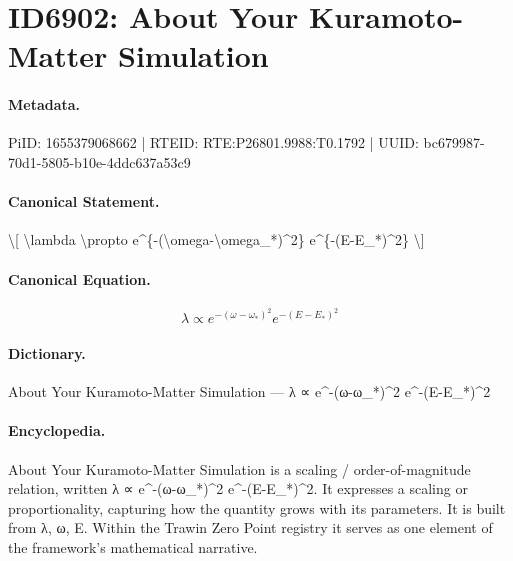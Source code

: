 \section*{ID6902: About Your Kuramoto-Matter Simulation}
\paragraph{Metadata.}
PiID: 1655379068662 | RTEID: RTE:P26801.9988:T0.1792 | UUID: bc679987-70d1-5805-b10e-4ddc637a53c9

\paragraph{Canonical Statement.}
\textbackslash{}[ \textbackslash{}lambda \textbackslash{}propto e\textasciicircum{}\{-(\textbackslash{}omega-\textbackslash{}omega\_*)\textasciicircum{}2\} e\textasciicircum{}\{-(E-E\_*)\textasciicircum{}2\} \textbackslash{}]

\paragraph{Canonical Equation.}
\[
\lambda \propto e^{-(\omega-\omega_*)^2} e^{-(E-E_*)^2}
\]

\paragraph{Dictionary.}
About Your Kuramoto-Matter Simulation — λ ∝ e\textasciicircum{}-(ω-ω\_*)\textasciicircum{}2 e\textasciicircum{}-(E-E\_*)\textasciicircum{}2

\paragraph{Encyclopedia.}
About Your Kuramoto-Matter Simulation is a scaling / order-of-magnitude relation, written λ ∝ e\textasciicircum{}-(ω-ω\_*)\textasciicircum{}2 e\textasciicircum{}-(E-E\_*)\textasciicircum{}2. It expresses a scaling or proportionality, capturing how the quantity grows with its parameters. It is built from λ, ω, E. Within the Trawin Zero Point registry it serves as one element of the framework's mathematical narrative.

